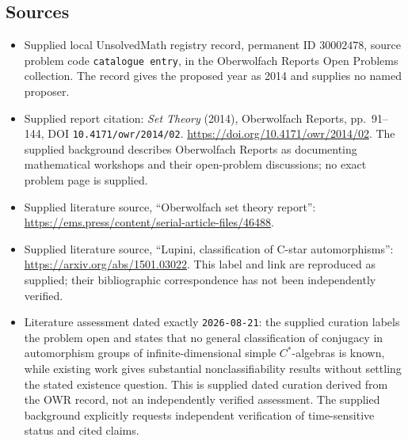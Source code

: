 \documentclass[11pt]{article}
\begin{document}
\subsection{Sources}
\begin{itemize}
\item Supplied local UnsolvedMath registry record, permanent ID \(30002478\), source problem code \texttt{catalogue entry}, in the Oberwolfach Reports Open Problems collection. The record gives the proposed year as 2014 and supplies no named proposer.
\item Supplied report citation: \emph{Set Theory} (2014), Oberwolfach Reports, pp.~91--144, DOI \texttt{10.4171/owr/2014/02}. \url{https://doi.org/10.4171/owr/2014/02}. The supplied background describes Oberwolfach Reports as documenting mathematical workshops and their open-problem discussions; no exact problem page is supplied.
\item Supplied literature source, ``Oberwolfach set theory report'': \url{https://ems.press/content/serial-article-files/46488}.
\item Supplied literature source, ``Lupini, classification of C-star automorphisms'': \url{https://arxiv.org/abs/1501.03022}. This label and link are reproduced as supplied; their bibliographic correspondence has not been independently verified.
\item Literature assessment dated exactly \texttt{2026-08-21}: the supplied curation labels the problem open and states that no general classification of conjugacy in automorphism groups of infinite-dimensional simple \(C^*\)-algebras is known, while existing work gives substantial nonclassifiability results without settling the stated existence question. This is supplied dated curation derived from the OWR record, not an independently verified assessment. The supplied background explicitly requests independent verification of time-sensitive status and cited claims.
\end{itemize}
\end{document}
